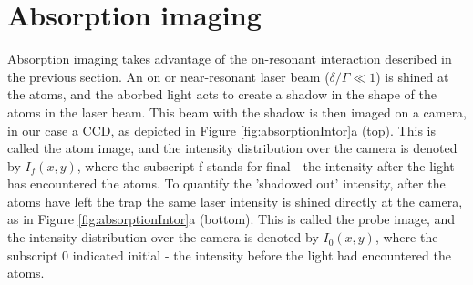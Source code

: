 \section{Absorption imaging}\label{sec:absorptionImaging}

Absorption imaging takes advantage of the on-resonant interaction described in the previous section. An on or near-resonant laser beam ($\delta/\Gamma\ll 1$) is shined at the atoms, and the aborbed light acts to create a shadow in the shape of the atoms in the laser beam. This beam with the shadow is then imaged on a camera, in our case a CCD, as depicted in Figure \ref{fig:absorptionIntor}a (top). This is called the atom image, and the intensity distribution over the camera is denoted by $I_f(x,y)$, where the subscript f stands for final - the intensity after the light has encountered the atoms. To quantify the 'shadowed out' intensity, after the atoms have left the trap the same laser intensity is shined directly at the camera, as in Figure \ref{fig:absorptionIntor}a (bottom).   This is called the probe image, and the intensity distribution over the camera is denoted by $I_0(x,y)$, where the subscript 0 indicated initial - the intensity before the light had encountered the atoms.



